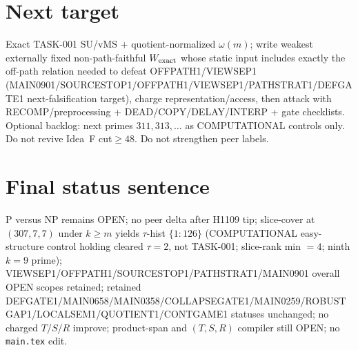 \documentclass[11pt]{article}
\begin{document}
\section*{Next target}
Exact TASK-001 SU/vMS + quotient-normalized $\omega(m)$; write weakest externally fixed non-path-faithful
$W_{\rm exact}$ whose static input includes exactly the off-path relation needed to defeat OFFPATH1/VIEWSEP1
(MAIN0901/SOURCESTOP1/OFFPATH1/VIEWSEP1/PATHSTRAT1/DEFGATE1 next-falsification target), charge representation/access,
then attack with RECOMP/preprocessing + DEAD/COPY/DELAY/INTERP + gate checklists.
Optional backlog: next primes $311,313,\ldots$ as COMPUTATIONAL controls only.
Do not revive Idea~F cut$\ge48$. Do not strengthen peer labels.

\section*{Final status sentence}
P versus NP remains OPEN; no peer delta after H1109 tip; slice-cover at $(307,7,7)$ under $k{\ge}m$ yields $\tau$-hist $\{1{:}126\}$ (COMPUTATIONAL easy-structure control holding cleared $\tau{=}2$, not TASK-001; slice-rank min $=4$; ninth $k{=}9$ prime); VIEWSEP1/OFFPATH1/SOURCESTOP1/PATHSTRAT1/MAIN0901 overall OPEN scopes retained; retained DEFGATE1/MAIN0658/MAIN0358/COLLAPSEGATE1/MAIN0259/ROBUSTGAP1/LOCALSEM1/QUOTIENT1/CONTGAME1 statuses unchanged; no charged $T$/$S$/$R$ improve; product-span and $(T,S,R)$ compiler still OPEN; no \texttt{main.tex} edit.
\end{document}
